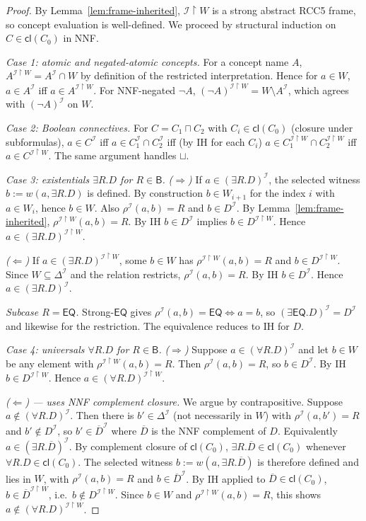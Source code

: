 \documentclass[11pt]{article}
\newcommand{\Base}{\mathsf{B}}
\newcommand{\EQ}{\mathsf{EQ}}
\newcommand{\Cl}{\mathsf{cl}}
\newcommand{\I}{\mathcal I}
\begin{document}
\begin{proof}
By Lemma~\ref{lem:frame-inherited}, $\I\!\upharpoonright\!W$ is a
strong abstract RCC5 frame, so concept evaluation is well-defined.
We proceed by structural induction on $C\in\Cl(C_0)$ in NNF.

\emph{Case 1: atomic and negated-atomic concepts.}  For a concept
name $A$, $A^{\I\upharpoonright W}=A^\I\cap W$ by definition of the
restricted interpretation.  Hence for $a\in W$, $a\in A^\I$ iff
$a\in A^{\I\upharpoonright W}$.  For NNF-negated $\neg A$,
$(\neg A)^{\I\upharpoonright W}=W\setminus A^\I$, which agrees with
$(\neg A)^\I$ on $W$.

\emph{Case 2: Boolean connectives.}  For $C=C_1\sqcap C_2$ with
$C_i\in\Cl(C_0)$ (closure under subformulas), $a\in C^\I$ iff
$a\in C_1^\I\cap C_2^\I$ iff (by IH for each $C_i$)
$a\in C_1^{\I\upharpoonright W}\cap C_2^{\I\upharpoonright W}$ iff
$a\in C^{\I\upharpoonright W}$.  The same argument handles
$\sqcup$.

\emph{Case 3: existentials $\exists R.D$ for $R\in\Base$.}
\emph{($\Rightarrow$)} If $a\in(\exists R.D)^\I$, the selected
witness $b:=w(a,\exists R.D)$ is defined.  By construction
$b\in W_{i+1}$ for the index $i$ with $a\in W_i$, hence $b\in W$.
Also $\rho^\I(a,b)=R$ and $b\in D^\I$.  By
Lemma~\ref{lem:frame-inherited},
$\rho^{\I\upharpoonright W}(a,b)=R$.  By IH $b\in D^\I$ implies
$b\in D^{\I\upharpoonright W}$.  Hence
$a\in(\exists R.D)^{\I\upharpoonright W}$.

\emph{($\Leftarrow$)} If $a\in(\exists R.D)^{\I\upharpoonright W}$,
some $b\in W$ has $\rho^{\I\upharpoonright W}(a,b)=R$ and
$b\in D^{\I\upharpoonright W}$.  Since $W\subseteq\Delta^\I$ and the
relation restricts, $\rho^\I(a,b)=R$.  By IH $b\in D^\I$.  Hence
$a\in(\exists R.D)^\I$.

\emph{Subcase $R=\EQ$.}  Strong-$\EQ$ gives
$\rho^\I(a,b)=\EQ\iff a=b$, so $(\exists \EQ.D)^\I=D^\I$ and likewise
for the restriction.  The equivalence reduces to IH for $D$.

\emph{Case 4: universals $\forall R.D$ for $R\in\Base$.}
\emph{($\Rightarrow$)} Suppose $a\in(\forall R.D)^\I$ and let
$b\in W$ be any element with
$\rho^{\I\upharpoonright W}(a,b)=R$.  Then $\rho^\I(a,b)=R$, so
$b\in D^\I$.  By IH $b\in D^{\I\upharpoonright W}$.  Hence
$a\in(\forall R.D)^{\I\upharpoonright W}$.

\emph{($\Leftarrow$) --- uses NNF complement closure.}  We argue by
contrapositive.  Suppose $a\notin(\forall R.D)^\I$.  Then there is
$b'\in\Delta^\I$ (not necessarily in $W$) with $\rho^\I(a,b')=R$ and
$b'\notin D^\I$, so $b'\in\overline D^\I$ where $\overline D$ is the
NNF complement of $D$.  Equivalently $a\in(\exists R.\overline D)^\I$.
By complement closure of $\Cl(C_0)$, $\exists R.\overline D\in\Cl(C_0)$
whenever $\forall R.D\in\Cl(C_0)$.  The selected witness
$b:=w(a,\exists R.\overline D)$ is therefore defined and lies in $W$,
with $\rho^\I(a,b)=R$ and $b\in\overline D^\I$.  By IH applied to
$\overline D\in\Cl(C_0)$, $b\in\overline D^{\I\upharpoonright W}$,
i.e.\ $b\notin D^{\I\upharpoonright W}$.  Since $b\in W$ and
$\rho^{\I\upharpoonright W}(a,b)=R$, this shows
$a\notin(\forall R.D)^{\I\upharpoonright W}$.


\end{proof}
\end{document}
